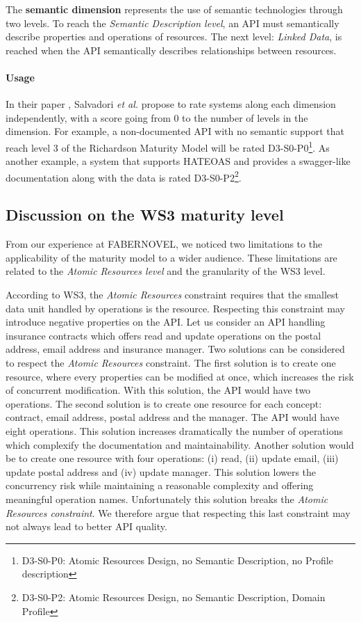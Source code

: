 The \textbf{semantic dimension} represents the use of semantic technologies through two levels. To reach the \textit{Semantic Description level}, an API must semantically describe properties and operations of resources. The next level: \textit{Linked Data}, is reached when the API semantically describes relationships between resources.

\paragraph{Usage}
In their paper \cite{7195633}, Salvadori \emph{et al.} propose to rate systems along each dimension independently, with a score going from 0 to the number of levels in the dimension.
For example, a non-documented API with no semantic support that reach level 3 of the Richardson Maturity Model will be rated D3-S0-P0\footnote{D3-S0-P0: Atomic Resources Design, no Semantic Description, no Profile description}. As another example, a system that supports HATEOAS and provides a swagger-like documentation along with the data is rated D3-S0-P2\footnote{D3-S0-P2: Atomic Resources Design, no Semantic Description, Domain Profile}.
\vspace*{-0.5cm}
\subsection{Discussion on the WS3 maturity level}
\vspace*{-0.2cm}

From our experience at FABERNOVEL, we noticed two limitations to the applicability of the maturity model to a wider audience. These limitations are related to the \textit{Atomic Resources level} and the granularity of the WS3 level.

According to WS3, the \textit{Atomic Resources} constraint requires that the smallest data unit handled by operations is the resource.
Respecting this constraint may introduce negative properties on the API.
Let us consider an API handling insurance contracts which offers read and update operations on the postal address, email address and insurance manager. 
Two solutions can be considered to respect the \textit{Atomic Resources} constraint. 
The first solution is to create one resource, where every properties can be modified at once, which increases the risk of concurrent modification. 
With this solution, the API would have two operations. 
The second solution is to create one resource for each concept: contract, email address, postal address and the manager. The API would have eight operations. This solution increases dramatically the number of operations which complexify the documentation and maintainability.
Another solution would be to create one resource with four operations: (i) read, (ii) update email, (iii) update postal address and (iv) update manager. 
This solution lowers the concurrency risk while maintaining a reasonable complexity and offering meaningful operation names. Unfortunately this solution breaks the \textit{Atomic Resources constraint}. We therefore argue that respecting this last constraint may not always lead to better API quality.

